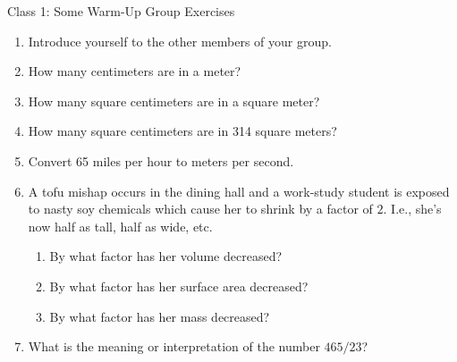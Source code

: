 \documentclass[12pt]{article}
\begin{document}
\pagestyle{empty}

\begin{center}
{\large Class 1:  Some Warm-Up Group Exercises}\\
\end{center}

\begin{enumerate}

\item Introduce yourself to the other members of your group.\\

\item How many centimeters are in a meter?\\

\item How many square centimeters are in a square meter?\\

\item How many square centimeters are in 314 square meters?\\

\item Convert 65 miles per hour to meters per second.\\



\item A tofu mishap occurs in the dining hall and a work-study student
is exposed to nasty soy chemicals which cause her to shrink by a
factor of $2$.  I.e., she's now half as tall, half as wide, etc.  
\begin{enumerate}
    \item By what factor has her volume decreased?  
    \item By what factor has her surface area decreased?
    \item By what factor has her mass decreased? \\
\end{enumerate}

\item What is the meaning or interpretation of the number $465/23$?\\


\end{enumerate}
\end{document}
